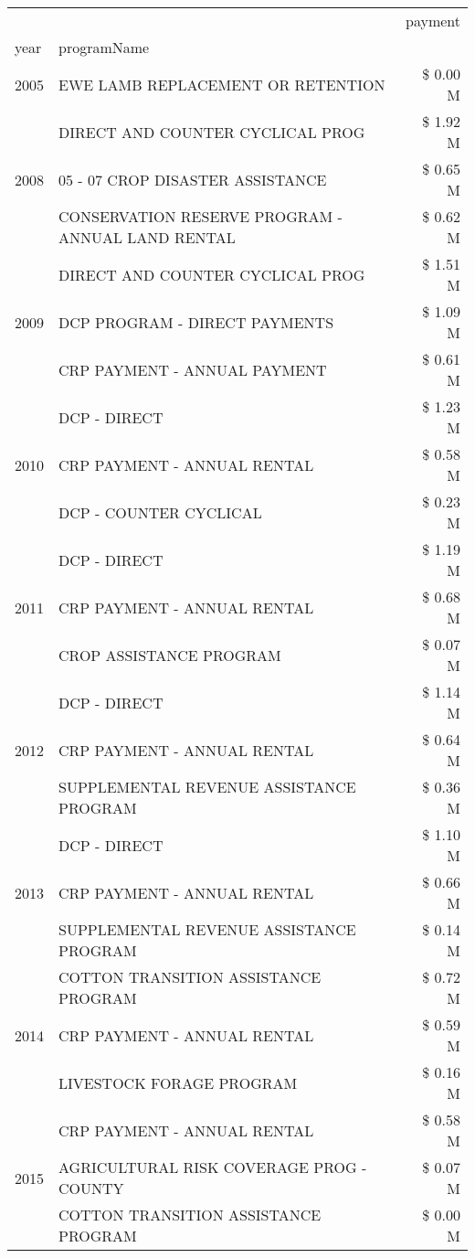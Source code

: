 \begin{tabular}{llr}
\toprule
 &  & payment \\
year & programName &  \\
\midrule
2005 & EWE LAMB REPLACEMENT OR RETENTION & \$ 0.00 M \\
\cline{1-3}
\multirow[t]{3}{*}{2008} & DIRECT AND COUNTER CYCLICAL PROG & \$ 1.92 M \\
 & 05 - 07 CROP DISASTER ASSISTANCE & \$ 0.65 M \\
 & CONSERVATION RESERVE PROGRAM - ANNUAL LAND RENTAL & \$ 0.62 M \\
\cline{1-3}
\multirow[t]{3}{*}{2009} & DIRECT AND COUNTER CYCLICAL PROG & \$ 1.51 M \\
 & DCP PROGRAM - DIRECT PAYMENTS & \$ 1.09 M \\
 & CRP PAYMENT - ANNUAL PAYMENT & \$ 0.61 M \\
\cline{1-3}
\multirow[t]{3}{*}{2010} & DCP - DIRECT & \$ 1.23 M \\
 & CRP PAYMENT - ANNUAL RENTAL & \$ 0.58 M \\
 & DCP - COUNTER CYCLICAL & \$ 0.23 M \\
\cline{1-3}
\multirow[t]{3}{*}{2011} & DCP - DIRECT & \$ 1.19 M \\
 & CRP PAYMENT - ANNUAL RENTAL & \$ 0.68 M \\
 & CROP ASSISTANCE PROGRAM & \$ 0.07 M \\
\cline{1-3}
\multirow[t]{3}{*}{2012} & DCP - DIRECT & \$ 1.14 M \\
 & CRP PAYMENT - ANNUAL RENTAL & \$ 0.64 M \\
 & SUPPLEMENTAL REVENUE ASSISTANCE PROGRAM & \$ 0.36 M \\
\cline{1-3}
\multirow[t]{3}{*}{2013} & DCP - DIRECT & \$ 1.10 M \\
 & CRP PAYMENT - ANNUAL RENTAL & \$ 0.66 M \\
 & SUPPLEMENTAL REVENUE ASSISTANCE PROGRAM & \$ 0.14 M \\
\cline{1-3}
\multirow[t]{3}{*}{2014} & COTTON TRANSITION ASSISTANCE PROGRAM & \$ 0.72 M \\
 & CRP PAYMENT - ANNUAL RENTAL & \$ 0.59 M \\
 & LIVESTOCK FORAGE PROGRAM & \$ 0.16 M \\
\cline{1-3}
\multirow[t]{3}{*}{2015} & CRP PAYMENT - ANNUAL RENTAL & \$ 0.58 M \\
 & AGRICULTURAL RISK COVERAGE PROG - COUNTY & \$ 0.07 M \\
 & COTTON TRANSITION ASSISTANCE PROGRAM & \$ 0.00 M \\

\end{tabular}
